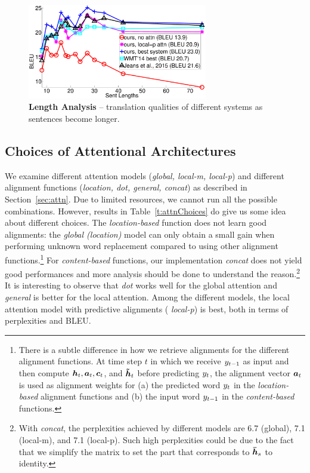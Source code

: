 \begin{figure}[tbh!]
\centering
\includegraphics[width=0.7\textwidth, clip=true, trim=120 0 70 0]{img/4-length} %
\caption[Length Analysis]{{\bf Length Analysis} -- translation qualities of different
systems as sentences become longer.
} 
\label{f:length}
\end{figure}

\subsection{Choices of Attentional Architectures}
We examine different attention models ({\it global, local-m, local-p}) and different
alignment functions ({\it location, dot, general, concat}) as described in
Section~\ref{sec:attn}. Due to limited
resources, we cannot run all the possible combinations.
However, results in Table~\ref{t:attnChoices} do give us some idea about
different choices. 
The {\it location-based} function does not learn good
alignments: the {\it global (location)} model can only obtain a small
gain when performing unknown word replacement compared to using other alignment
functions.\footnote{There is a subtle difference in how we retrieve alignments
for the different alignment functions. At time step $t$ in which we receive
$y_{t-1}$ as input and then compute $\mbox{\boldmath{$h$}}_{t}, \mbox{\boldmath{$a$}}_{t}, \mbox{\boldmath{$c$}}_{t}$, and $\mbox{\boldmath{$\tilde{h}$}}_{t}$ before
predicting $y_{t}$, the alignment vector $\mbox{\boldmath{$a$}}_{t}$ is used as alignment
weights for (a) the predicted word $y_{t}$ in the {\it location-based}
alignment functions and (b) the input word $y_{t-1}$ in the {\it content-based}
functions.}
For {\it content-based} functions, our implementation {\it concat} does not yield good performances
and more analysis should be done to understand the
reason.\footnote{With {\it concat}, the perplexities achieved by different models are 6.7 (global), 7.1
(local-m), and 7.1 (local-p). Such high perplexities could be due to the fact
that we simplify the matrix  to set the part that corresponds to $\mbox{\boldmath{$\bar{h}$}}_{s}$
to identity.} It is interesting to observe that {\it dot} works
well for the global attention and {\it general} is better for the local
attention.
Among the different models, the local attention model with predictive alignments ({\it
local-p}) is best, both in terms of perplexities and BLEU.


